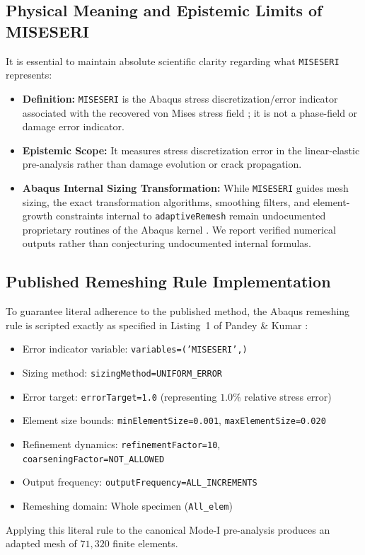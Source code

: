 \subsection{Physical Meaning and Epistemic Limits of MISESERI}
It is essential to maintain absolute scientific clarity regarding what \texttt{MISESERI} represents:
\begin{itemize}[leftmargin=4mm,itemsep=1pt,topsep=1pt]
  \item \textbf{Definition:} \texttt{MISESERI} is the Abaqus stress discretization/error indicator associated with the recovered von Mises stress field \citep{Abaqus2023}; it is not a phase-field or damage error indicator.
  \item \textbf{Epistemic Scope:} It measures stress discretization error in the linear-elastic pre-analysis rather than damage evolution or crack propagation.
  \item \textbf{Abaqus Internal Sizing Transformation:} While \texttt{MISESERI} guides mesh sizing, the exact transformation algorithms, smoothing filters, and element-growth constraints internal to \texttt{adaptiveRemesh} remain undocumented proprietary routines of the Abaqus kernel \citep{Abaqus2023}. We report verified numerical outputs rather than conjecturing undocumented internal formulas.
\end{itemize}

\subsection{Published Remeshing Rule Implementation}
To guarantee literal adherence to the published method, the Abaqus remeshing rule is scripted exactly as specified in Listing~1 of Pandey \& Kumar \citep{Pandey2025}:
\begin{itemize}[leftmargin=4mm,itemsep=1pt,topsep=1pt]
  \item Error indicator variable: \texttt{variables=('MISESERI',)}
  \item Sizing method: \texttt{sizingMethod=UNIFORM\_ERROR}
  \item Error target: \texttt{errorTarget=1.0} (representing $1.0\%$ relative stress error)
  \item Element size bounds: \texttt{minElementSize=0.001}, \texttt{maxElementSize=0.020}
  \item Refinement dynamics: \texttt{refinementFactor=10}, \texttt{coarseningFactor=NOT\_ALLOWED}
  \item Output frequency: \texttt{outputFrequency=ALL\_INCREMENTS}
  \item Remeshing domain: Whole specimen (\texttt{All\_elem})
\end{itemize}
Applying this literal rule to the canonical Mode-I pre-analysis produces an adapted mesh of $71{,}320$ finite elements.
